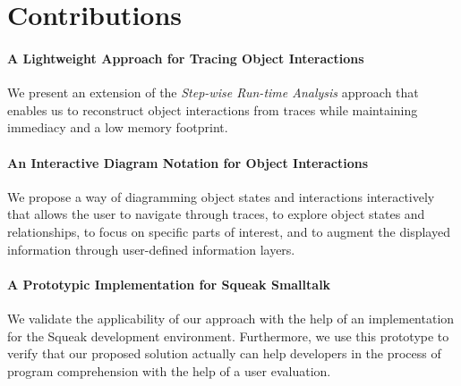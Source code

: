 \section{Contributions}
\label{s:contributions}

\paragraph{A Lightweight Approach for Tracing Object Interactions} We present an extension of the \emph{Step-wise Run-time Analysis} approach that enables us to reconstruct object interactions from traces while maintaining immediacy and a low memory footprint.

\paragraph{An Interactive Diagram Notation for Object Interactions} We propose a way of diagramming object states and interactions interactively that allows the user to navigate through traces, to explore object states and relationships, to focus on specific parts of interest, and to augment the displayed information through user-defined information layers.

\paragraph{A Prototypic Implementation for Squeak Smalltalk} We validate the applicability of our approach with the help of an implementation for the Squeak development environment.
Furthermore, we use this prototype to verify that our proposed solution actually can help developers in the process of program comprehension with the help of a user evaluation.

